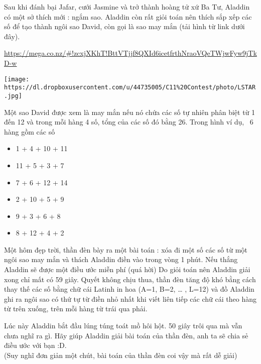 Sau khi đánh bại Jafar, cưới Jasmine và trở thành hoàng tử xứ Ba Tư, Aladdin có một sở thích mới : ngắm sao. Aladdin còn rất giỏi toán nên thích sắp xếp các số để tạo thành ngôi sao David, còn gọi là sao may mắn (tải hình từ link dưới đây).  

\href{https://mega.co.nz/#!zcxjXKhT!BttVTjjf8QXId6icetfrthNraoVQeTWjwFyw9jTkD-w}{    https://mega.co.nz/\#!zcxjXKhT!BttVTjjf8QXId6icetfrthNraoVQeTWjwFyw9jTkD-w   }


\texttt{[image: https://dl.dropboxusercontent.com/u/44735005/C11\%20Contest/photo/LSTAR.jpg]}

   Một sao David được xem là may mắn nếu nó chứa các số tự nhiên phân biệt từ 1 đến 12 và trong mỗi hàng 4 số, tổng của các số đó bằng 26. Trong hình ví dụ,  6 hàng gồm các số  
\begin{itemize}
	\item     1 + 4 + 10 + 11   
	\item     11 + 5 + 3 + 7   
	\item     7 + 6 + 12 + 14   
	\item     2 + 10 + 5 + 9   
	\item     9 + 3 + 6 + 8   
	\item     8 + 12 + 4 + 2   
\end{itemize}

   Một hôm đẹp trời, thần đèn bày ra một bài toán : xóa đi một số các số từ một ngôi sao may mắn và thách Aladdin điền vào trong vòng 1 phút. Nếu thắng Aladdin sẽ được một điều ước miễn phí (quá hời) Do giỏi toán nên Aladdin giải xong chỉ mất có 59 giây. Quyết không chịu thua, thần đèn tăng độ khó bằng cách thay thế các số bằng chữ cái Latinh in hoa (A=1, B=2, … , L=12) và đồ Aladdin ghi ra ngôi sao có thứ tự từ điền nhỏ nhất khi viết liên tiếp các chữ cái theo hàng từ trên xuống, trên mỗi hàng từ trái qua phải.  

   Lúc này Aladdin bắt đầu lúng túng toát mồ hôi hột. 50 giây trôi qua mà vẫn chưa nghĩ ra gì. Hãy giúp Aladdin giải bài toán của thần đèn, anh ta sẽ chia sẻ điều ước với bạn :D.   
\\   (Suy nghĩ đơn giản một chút, bài toán của thần đèn coi vậy mà rất dễ giải)
